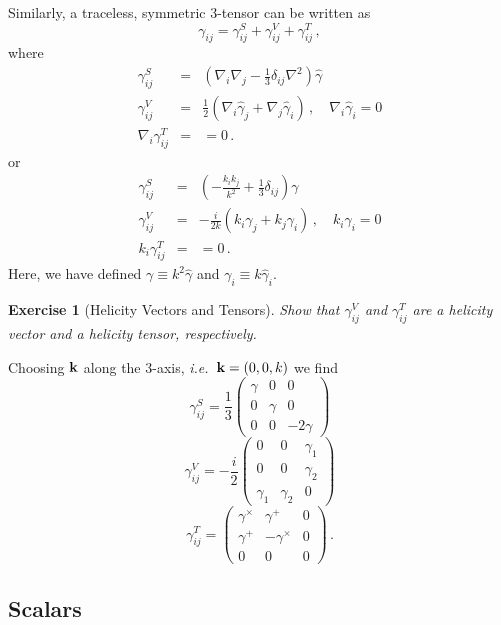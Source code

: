 \documentclass[12pt,letterpaper,rotate]{article}
\def\beq{\begin{equation}}
\def\eeq{\end{equation}}
\newtheorem{thm}{Exercise}
\begin{document}
{Similarly, a traceless, symmetric 3-tensor can be written as
\beq
\gamma_{ij} = \gamma_{ij}^S + \gamma_{ij}^V + \gamma_{ij}^T\, ,
\eeq
where
\begin{eqnarray}
\gamma_{ij}^S &=& \left( \nabla_i \nabla_j - \frac{1}{3} \delta_{ij} \nabla^2 \right) \hat \gamma\\
\gamma_{ij}^V &=& \frac{1}{2} \left(\nabla_i \hat \gamma_j + \nabla_j \hat \gamma_i \right)\, , \quad \nabla_i \hat \gamma_i =0\\
\nabla_i \gamma_{ij}^T &=&  =0\, .
\end{eqnarray}
or
\begin{eqnarray}
\gamma_{ij}^S &=&  \left(-\frac{k_i k_j}{k^2} + \frac{1}{3} \delta_{ij} \right) \gamma\\
\gamma_{ij}^V &=& -\frac{i}{2k} \left( k_i \gamma_j + k_j \gamma_i \right)\, , \quad k_i \gamma_i =0\\
k_i \gamma_{ij}^T &=&  =0\, .
\end{eqnarray}
Here, we have defined $\gamma \equiv k^2 \hat \gamma$ and $\gamma_i \equiv k \hat \gamma_i$.

\begin{thm}[Helicity Vectors and Tensors]
Show that $\gamma_{ij}^V$ and $\gamma_{ij}^T$ are a helicity vector and a helicity tensor, respectively.
\end{thm}

Choosing ${\bf k}$ along the 3-axis, {\it i.e.}~${\bf k}=(0,0,k)$ we find
\beq
\gamma_{ij}^S = \frac{1}{3} \left( \begin{array}{ccc} \gamma & 0 & 0 \\ 0 & \gamma & 0 \\ 0 & 0 & - 2 \gamma \end{array}\right)
\eeq
\beq
\gamma_{ij}^V = -\frac{i}{2} \left( \begin{array}{ccc} 0 & 0 & \gamma_1 \\ 0 & 0 & \gamma_2 \\ \gamma_1 & \gamma_2 & 0 \end{array}\right)
\eeq
\beq
\gamma_{ij}^T =  \left( \begin{array}{ccc} \gamma^\times & \gamma^+ & 0 \\ \gamma^+ & - \gamma^\times & 0 \\ 0 & 0 & 0 \end{array}\right)\, .
\eeq

\subsection{Scalars}

}
\end{document}
